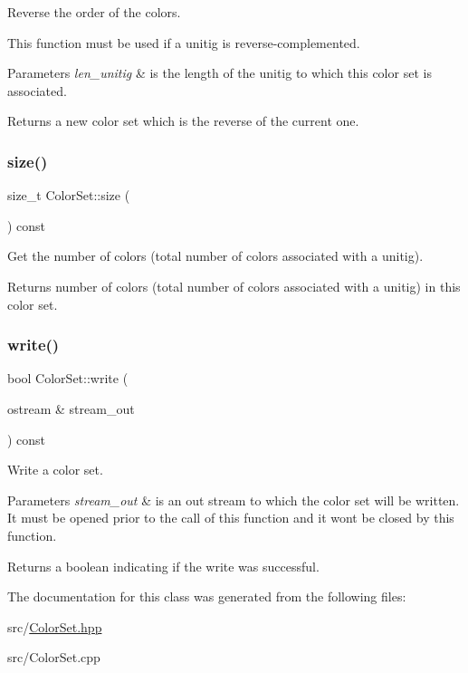 Reverse the order of the colors. 

This function must be used if a unitig is reverse-\/complemented. 
\begin{DoxyParams}{Parameters}
{\em len\+\_\+unitig} & is the length of the unitig to which this color set is associated. \\
\hline
\end{DoxyParams}
\begin{DoxyReturn}{Returns}
a new color set which is the reverse of the current one. 
\end{DoxyReturn}
\mbox{\label{classColorSet_a9b987d139b85a1c53bb5a5ba4ee10a75}} 
\subsubsection{\texorpdfstring{size()}{size()}}
{\footnotesize\ttfamily size\+\_\+t Color\+Set\+::size (\begin{DoxyParamCaption}{ }\end{DoxyParamCaption}) const}



Get the number of colors (total number of colors associated with a unitig). 

\begin{DoxyReturn}{Returns}
number of colors (total number of colors associated with a unitig) in this color set. 
\end{DoxyReturn}
\mbox{\label{classColorSet_a74e1df482946158e01659d15b5b71375}} 
\subsubsection{\texorpdfstring{write()}{write()}}
{\footnotesize\ttfamily bool Color\+Set\+::write (\begin{DoxyParamCaption}\item[{ostream \&}]{stream\+\_\+out }\end{DoxyParamCaption}) const}



Write a color set. 


\begin{DoxyParams}{Parameters}
{\em stream\+\_\+out} & is an out stream to which the color set will be written. It must be opened prior to the call of this function and it won\textquotesingle{}t be closed by this function. \\
\hline
\end{DoxyParams}
\begin{DoxyReturn}{Returns}
a boolean indicating if the write was successful. 
\end{DoxyReturn}


The documentation for this class was generated from the following files\+:\begin{DoxyCompactItemize}
\item 
src/\hyperlink{ColorSet_8hpp}{Color\+Set.\+hpp}\item 
src/Color\+Set.\+cpp\end{DoxyCompactItemize}
